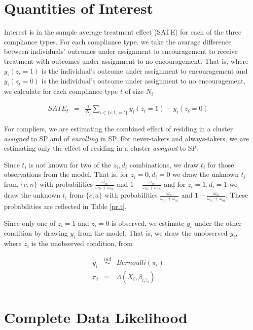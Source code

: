 \documentclass[12pt]{article}
\begin{document}
\section{Quantities of Interest}

Interest is in the sample average treatment effect (SATE) for each of
the three compliance types.  For each compliance type, we take the
avarage difference between individuals' outcomes under assignment to
encouragement to receive treatment with outcomes under assignment to no
encouragement.  That is, where $y_i(z_i=1)$ is the individual's
outcome under assignment to encouragement and $y_i(z_i=0)$ is the
individual's outcome under assignment to no encouragement, we
calculate for each compliance type $t$ of size $N_t$

\begin{eqnarray*}
SATE_t & = & \frac{1}{N_t} \sum_{i \in \{i:t_i= t\}} y_i(z_i=1) - y_i(z_i=0)
\end{eqnarray*}

For compliers, we are estimating the combined effect of residing in a
cluster \emph{assigned} to SP and of \emph{enrolling} in SP.  For
never-takers and always-takers, we are estimating only the effect of
residing in a cluster \emph{assigned} to SP.

Since $t_i$ is not known for two of the $z_i,d_i$ combinations, we
draw $t_i$ for those observations from the model.  That is, 
for  $z_i=0,d_i=0$ we draw the unknown $t_i$ from $\{c,n\}$ with
probabilities $\frac{\omega_{ic}}{\omega_{ic} + \omega_{in}}$ and
$1-\frac{\omega_{ic}}{\omega_{ic} + \omega_{in}}$ and for
$z_i=1,d_i=1$ we draw the unknown $t_i$ from $\{c,a\}$ with
probabilities $\frac{\omega_{ic}}{\omega_{ic} + \omega_{ia}}$ and
$1-\frac{\omega_{ic}}{\omega_{ic} + \omega_{ia}}$.  These
probabilities are reflected in Table \ref{pr.t}.

Since only one of $z_i=1$ and $z_i=0$ is observed, we estimate $y_i$
under the other condition by drawing $y_i$ from the model.  That is,
we draw the unobserved $y_i$, where $\bar{z}_i$ is the unobserved
condition, from

\begin{eqnarray*}
y_i & \stackrel{ind}{\sim} & Bernoulli(\pi_i) \\
\pi_i & = & \Lambda(X_i, \beta_{t_i \bar{z}_i})\\
\end{eqnarray*}



\section{Complete Data Likelihood}
\end{document}

